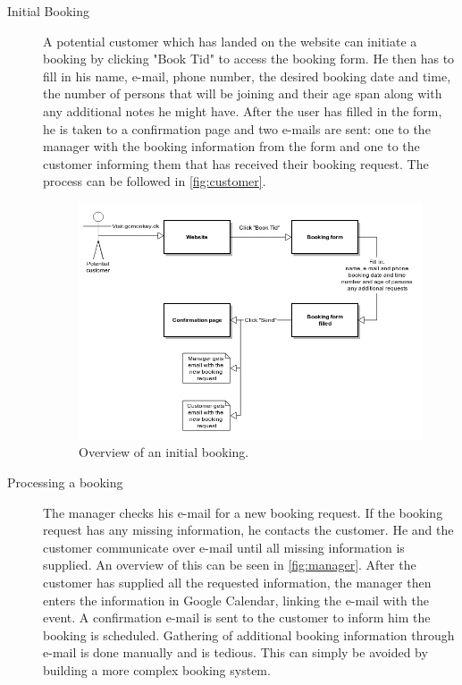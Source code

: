 \begin{description}
\item[Initial Booking]
A potential customer which has landed on the website can initiate a booking
by clicking "Book Tid" to access the booking form. He then has to fill in his name, e-mail, phone number, 
the desired booking date and time, the number of persons that will be joining and their
age span along with any additional notes he might have. 
After the user has filled in the form, he is taken to a confirmation
page and two e-mails are sent: one to the manager with the booking information from the form and
one to the customer informing them that \gomonkey{} has received their booking request. The process
can be followed in \autoref{fig:customer}.

\begin{figure}[htbp]
    \centering
        \includegraphics[width=\textwidth]{figures/customer.png}
            \caption{Overview of an initial booking.}
        \label{fig:customer}
\end{figure}

\item[Processing a booking]
The manager checks his e-mail for a new booking request. If the booking request has any missing information, he contacts the customer.
He and the customer communicate over e-mail until all missing information is supplied.
An overview of this can be seen in \autoref{fig:manager}. 
After the customer has supplied all the requested information, the manager then enters the information in Google
Calendar, linking the e-mail with the event. A confirmation e-mail is sent to the customer to inform him the booking is scheduled.
Gathering of additional booking information through e-mail is done manually and is tedious. This can simply be avoided by 
building a more complex booking system. 


\end{description}
